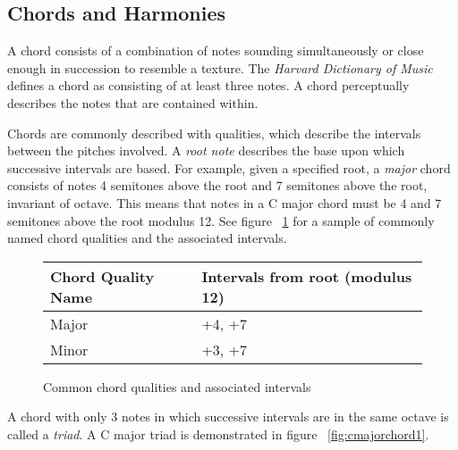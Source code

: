 \subsection{Chords and Harmonies}

A chord consists of a combination of notes sounding simultaneously or close enough in succession to resemble a texture. The \textit{Harvard Dictionary of Music} defines a chord as consisting of at least three notes\cite{harvdict}. A chord perceptually describes the notes that are contained within.

Chords are commonly described with qualities, which describe the intervals between the pitches involved. A \textit{root note} describes the base upon which successive intervals are based. For example, given a specified root, a \textit{major} chord consists of notes 4 semitones above the root and 7 semitones above the root, invariant of octave. This means that notes in a C major chord must be 4 and 7 semitones above the root modulus 12. See figure ~\ref{fig:qualitytable} for a sample of commonly named chord qualities and the associated intervals.

\begin{figure}[h!]
\begin{center}
\begin{table}[h]
\begin{tabular}{l|l}
Chord Quality Name & Intervals from root (modulus 12) \\ \hline
Major      & +4, +7                           \\
Minor      & +3, +7                          
\end{tabular}
\end{table}
\caption{Common chord qualities and associated intervals}
\label{fig:qualitytable}
\end{center}
\end{figure}

A chord with only 3 notes in which successive intervals are in the same octave is called a \textit{triad}. A C major triad is demonstrated in figure ~\ref{fig:cmajorchord1}.




